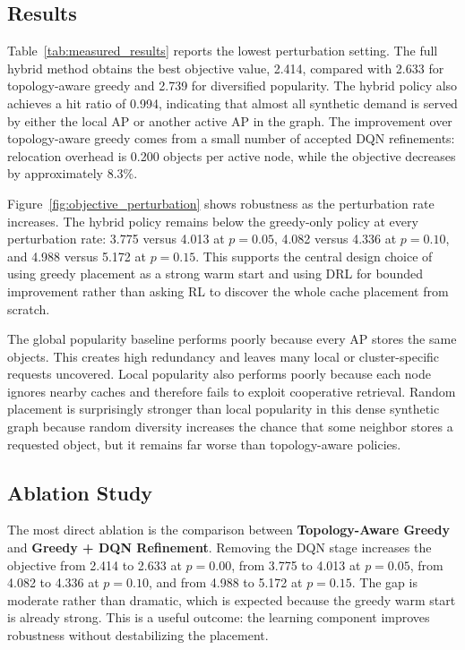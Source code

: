 \subsection{Results}




Table~\ref{tab:measured_results} reports the lowest perturbation setting. The full hybrid method obtains the best objective value, 2.414, compared with 2.633 for topology-aware greedy and 2.739 for diversified popularity. The hybrid policy also achieves a hit ratio of 0.994, indicating that almost all synthetic demand is served by either the local AP or another active AP in the graph. The improvement over topology-aware greedy comes from a small number of accepted DQN refinements: relocation overhead is 0.200 objects per active node, while the objective decreases by approximately 8.3\%.

Figure~\ref{fig:objective_perturbation} shows robustness as the perturbation rate increases. The hybrid policy remains below the greedy-only policy at every perturbation rate: 3.775 versus 4.013 at \(p=0.05\), 4.082 versus 4.336 at \(p=0.10\), and 4.988 versus 5.172 at \(p=0.15\). This supports the central design choice of using greedy placement as a strong warm start and using DRL for bounded improvement rather than asking RL to discover the whole cache placement from scratch.

The global popularity baseline performs poorly because every AP stores the same objects. This creates high redundancy and leaves many local or cluster-specific requests uncovered. Local popularity also performs poorly because each node ignores nearby caches and therefore fails to exploit cooperative retrieval. Random placement is surprisingly stronger than local popularity in this dense synthetic graph because random diversity increases the chance that some neighbor stores a requested object, but it remains far worse than topology-aware policies.

\subsection{Ablation Study}

The most direct ablation is the comparison between \textbf{Topology-Aware Greedy} and \textbf{Greedy + DQN Refinement}. Removing the DQN stage increases the objective from 2.414 to 2.633 at \(p=0.00\), from 3.775 to 4.013 at \(p=0.05\), from 4.082 to 4.336 at \(p=0.10\), and from 4.988 to 5.172 at \(p=0.15\). The gap is moderate rather than dramatic, which is expected because the greedy warm start is already strong. This is a useful outcome: the learning component improves robustness without destabilizing the placement.

